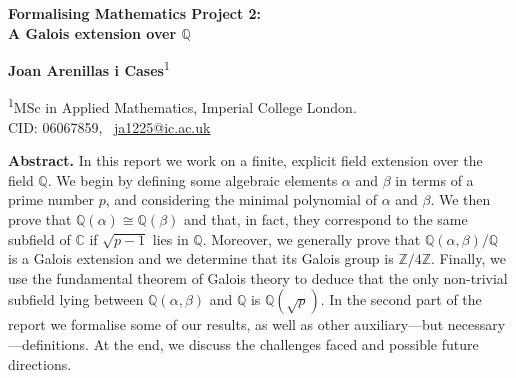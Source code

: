 \documentclass[a4paper,11pt]{article}
\theoremstyle{plain}
\newcommand{\R}{\ensuremath{\mathbb{R}}} %
\newcommand{\Q}{\ensuremath{\mathbb{Q}}} %
\newcommand{\Z}{\ensuremath{\mathbb{Z}}} %
\newcommand{\C}{\ensuremath{\mathbb{C}}} %
\begin{document}
	\sffamily
	
	\begin{center}
		{\LARGE\bfseries
			Formalising Mathematics Project 2: \\[0.3em]
			A Galois extension over $\Q$\\[0.3em]
			\par}
	\end{center}
	
	\vspace{0.4cm}
	
	\begin{center}
		\textbf{Joan Arenillas i Cases}\textsuperscript{1}
	\end{center}
	
	\vspace{0.5cm}
	
	\noindent
	\textsuperscript{1}MSc in Applied Mathematics, Imperial College London.\\
	CID: 06067859, \ \href{mailto:ja1225@ic.ac.uk}{ja1225@ic.ac.uk}
	
	\vspace{0.6cm}
	
	\vspace{0.5cm}
	
	\noindent
	\textbf{Abstract.}
	In this report we work on a finite, explicit field extension over the field $\Q$. We begin by defining some algebraic elements $\alpha$ and $\beta$ in terms of a prime number $p$, and considering the minimal polynomial of $\alpha$ and $\beta$. We then prove that $\Q(\alpha)\cong\Q(\beta)$ and that, in fact, they correspond to the same subfield of $\C$ if $\sqrt{p-1}$ lies in $\Q$. Moreover, we generally prove that $\Q(\alpha,\beta)/\Q$ is a Galois extension and we determine that its Galois group is $\Z/4\Z$. Finally, we use the fundamental theorem of Galois theory to deduce that the only non-trivial subfield lying between $\Q(\alpha,\beta)$ and $\Q$ is $\Q(\sqrt{p})$. In the second part of the report we formalise some of our results, as well as other auxiliary---but necessary---definitions. At the end, we discuss the challenges faced and possible future directions.
	
\end{document}
